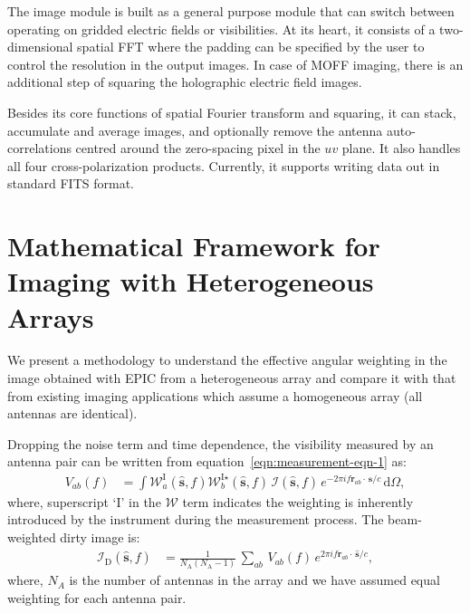 \documentclass[a4paper,fleqn,usenatbib]{mnras}
\newcommand{\Nant}{N_\textrm{A}}
\newcommand{\dif}{\mathrm{d}}
\begin{document}
The image module is built as a general purpose module that can switch between 
operating on gridded electric fields or visibilities. At its heart, it consists
of a two-dimensional spatial FFT where the padding can be specified by the user 
to control the resolution in the output images. In case of MOFF imaging, there 
is an additional step of squaring the holographic electric field images. 

Besides its core functions of spatial Fourier transform and squaring, it can 
stack, accumulate and average images, and optionally remove the antenna
auto-correlations centred around the zero-spacing pixel in the $uv$ plane. 
It also handles all four cross-polarization products. Currently, it supports 
writing data out in standard FITS format. 

\section{Mathematical Framework for Imaging with Heterogeneous Arrays}\label{sec:math-versatility}

We present a methodology to understand the effective angular weighting in the image obtained with EPIC from a heterogeneous array and compare it with that from existing imaging applications which assume a homogeneous array (all antennas are identical). %

Dropping the noise term and time dependence, the visibility measured by an antenna pair can be written from equation~\ref{eqn:measurement-eqn-1} as:
\begin{align}\label{eqn:apndx-measurement-eqn-2}
  V_{ab}(f) &= \int \mathcal{W}^\textrm{I}_a(\hat{\mathbf{s}},f)\mathcal{W}^{\textrm{I}\star}_b(\hat{\mathbf{s}},f)\,\mathcal{I}(\hat{\mathbf{s}},f)\,e^{-2\pi i f\mathbf{r}_{ab}\!\cdot\,\hat{\mathbf{s}}/c}\,\dif\Omega,
\end{align}
where, superscript `$\textrm{I}$' in the $\mathcal{W}$ term indicates the weighting is inherently introduced by the instrument during the measurement process. The beam-weighted dirty image is:
\begin{align}
  \mathcal{I}_\textrm{D}(\hat{\mathbf{s}},f) &= \frac{1}{\Nant(\Nant-1)}\,\sum_{ab}\, V_{ab}(f)\,e^{2\pi i f\mathbf{r}_{ab}\!\cdot\,\hat{\mathbf{s}}/c},
\end{align}
where, $N_A$ is the number of antennas in the array and we have assumed equal weighting for each antenna pair.
\end{document}
